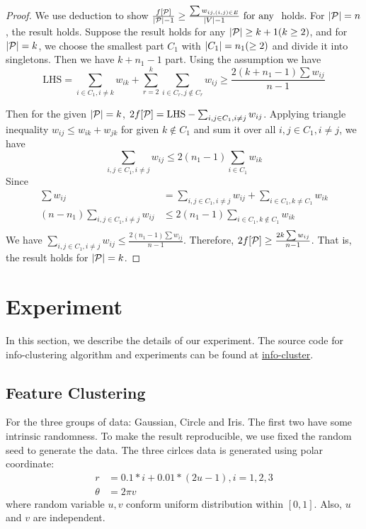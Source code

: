 \documentclass{article}
\begin{document}

\begin{proof}


We use deduction to show  
$\frac{f[\P]}{\abs{\P}-1} \geq \frac{\sum w_{ij, (i,j) \in E}}{\abs{V}-1} \textrm{ for any } $
 holds. For $\abs{\P}=n$, the result holds. Suppose the result holds for any $\abs{\P} \geq k+1(k\geq 2)$, and for $\abs{\P}=k$, we choose the smallest part $C_1$ with $\abs{C_1}=n_1(\geq 2)$ and divide it into singletons. Then we have $k+n_1-1$ part. Using the assumption we have
$$
\mathrm{LHS} = \sum_{i\in C_1, i\neq k} w_{ik} + \sum_{r=2}^k \sum_{i \in C_r, j \not\in C_r} w_{ij}\geq \frac{2(k+n_1 -1)\sum w_{ij}}{n-1}
$$

Then for the given $\abs{\P}=k$, $2f[\P] =\mathrm{LHS} - \sum_{i,j\in C_1, i\neq j} w_{ij}$.
Applying triangle inequality $w_{ij} \leq w_{ik} + w_{jk}$ for given $k\not\in C_1$ and sum it over all $i, j \in C_1, i\neq j$, we have
$$
\sum_{i,j \in C_1, i\neq j} w_{ij} \leq 2(n_1-1)\sum_{i\in C_1} w_{ik}
$$
Since
\begin{align*}
\sum w_{ij} &= \sum_{i,j \in C_1, i\neq j} w_{ij} + \sum_{i\in C_1, k\neq C_1} w_{ik} \\
(n - n_1) \sum_{i,j \in C_1, i\neq j} w_{ij}& \leq 2(n_1 - 1) \sum_{i \in C_1, k \not\in C_1} w_{ik} \\
\end{align*}
We have $\sum_{i,j \in C_1, i\neq j} w_{ij} \leq \frac{2(n_1-1) \sum w_{ij}}{n-1}$. Therefore, 
$2f[\P] \geq \frac{2k \sum w_{ij}}{n-1}$. That is, the result holds for $\abs{\P}=k$.
\end{proof}
\section{Experiment}
In this section, we describe the details of our experiment. The source code for info-clustering algorithm and experiments can be found at \href{https://github.com/zhaofeng-shu33/lab2c\_presentation\_template}{info-cluster}.
\subsection{Feature Clustering}
For the three groups of data: \textsf{Gaussian}, \textsf{Circle} and \textsf{Iris}. The first two have some intrinsic randomness. To make the result reproducible, we use fixed the random seed to generate the data. The three cirlces data is generated using polar coordinate:
\begin{align*}
r &= 0.1*i + 0.01*(2u-1), i = 1, 2, 3\\
\theta & = 2\pi v
\end{align*}
where random variable $u,v$ conform uniform distribution within $[0,1]$. Also, $u$ and $v$ are independent.
\end{document}
